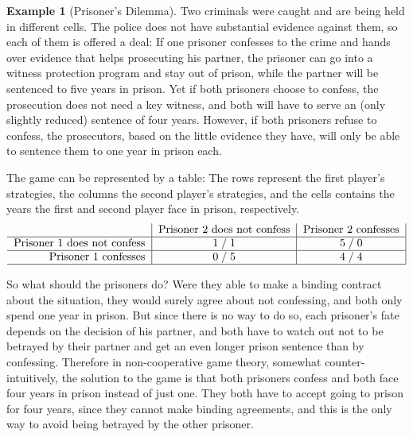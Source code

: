 \documentclass[a4paper,DIV=11]{scrreprt}
\theoremstyle{definition}
\newtheorem{ex}[thm]{Example} %
\begin{document}
    \begin{ex}[Prisoner's Dilemma]
        Two criminals were caught and are being held in different cells. The police does not have substantial evidence against them, so each of them is offered a deal: If one prisoner confesses to the crime and hands over evidence that helps prosecuting his partner, the prisoner can go into a witness protection program and stay out of prison, while the partner will be sentenced to five years in prison. Yet if both prisoners choose to confess, the prosecution does not need a key witness, and both will have to serve an (only slightly reduced) sentence of four years. However, if both prisoners refuse to confess, the prosecutors, based on the little evidence they have, will only be able to sentence them to one year in prison each.
        
        The game can be represented by a table: 
        The rows represent the first player's strategies, the columns the second player's strategies,  and the cells contains the years the first and second player face in prison, respectively.
        \begin{gather*}
            \centering
            \begin{tabular}{r|c|c|}
            	                    & Prisoner 2 does not confess & Prisoner 2 confesses \\ \hline
            	Prisoner 1 does not confess &       1\;/\;1       &   5\;/\;0    \\ \hline
            	   Prisoner 1 confesses     &       0\;/\;5       &   4\;/\;4    \\ \hline
            \end{tabular}
        \end{gather*}
    
        
        So what should the prisoners do?
        Were they able to make a binding contract about the situation, they would surely agree about not confessing, and both only spend one year in prison. But since there is no way to do so, each prisoner's fate depends on the decision of his partner, and both have to watch out not to be betrayed by their partner and get an even longer prison sentence than by confessing.
        Therefore in non-cooperative game theory, somewhat counter-intuitively, the solution to the game is that both prisoners confess and both face four years in prison instead of just one.
        They both have to accept going to prison for four years, since they cannot make binding agreements, and this is the only way to avoid being betrayed by the other prisoner.
        \label{ex:prisonersDilemma}
        \label{ex:gameTheoryIntroductoryExample}
    \end{ex}
\end{document}
